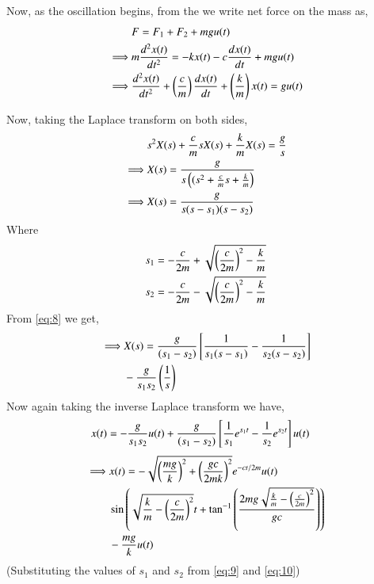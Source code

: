 \documentclass[journal,12pt,twocolumn]{IEEEtran}
\theoremstyle{remark}
\begin{document}
    Now, as the oscillation begins, from the  we write net force on the mass as,
    \begin{align}
        &F=F_{1}+F_{2}+mgu(t) \label{eq:3}\\
        \implies &m\frac{d^2x(t)}{dt^2}=-kx(t)-c\frac{dx(t)}{dt}+mgu(t) \label{eq:4}\\
        \implies &\frac{d^2x(t)}{dt^2}+\brak{\frac{c}{m}}\frac{dx(t)}{dt}+\brak{\frac{k}{m}}x(t)=gu(t) \label{eq:5}
    \end{align}

    Now, taking the Laplace transform on both sides,
    \begin{align}
        &s^2X(s)+\frac{c}{m}sX(s)+\frac{k}{m}X(s)=\frac{g}{s} \label{eq:6}\\
        \implies &X(s)=\frac{g}{s\brak{(s^2+\frac{c}{m}s+\frac{k}{m}}} \label{eq:7}\\
        \implies &X(s)=\frac{g}{s(s-s_1)(s-s_2)} \label{eq:8}
    \end{align}
    Where
    \begin{align}
        &s_1=-\frac{c}{2m}+\sqrt{\brak{\frac{c}{2m}}^2-\frac{k}{m}} \label{eq:9}\\
        &s_2=-\frac{c}{2m}-\sqrt{\brak{\frac{c}{2m}}^2-\frac{k}{m}} \label{eq:10}
    \end{align}
    From \eqref{eq:8} we get,
    \begin{align}
        \begin{split}
            \implies &X(s)=\frac{g}{(s_1-s_2)}\sbrak{\frac{1}{s_1(s-s_1)}-\frac{1}{s_2(s-s_2)}} \\
            &-\frac{g}{s_1s_2}\brak{\frac{1}{s}} \label{eq:11}
        \end{split}
    \end{align}
    Now again taking the inverse Laplace transform we have,
    \begin{align}
        &x(t)=-\frac{g}{s_1s_2}u(t)+\frac{g}{(s_1-s_2)}\sbrak{\frac{1}{s_1}e^{s_1t}-\frac{1}{s_2}e^{s_2t}}u(t)\label{eq:12}
    \end{align}
    \begin{align}
    \begin{split}
    \implies &x(t) = -\sqrt{\brak{\frac{mg}{k}}^2 + \brak{\frac{gc}{2mk}}^2}e^{-ct/2m}u(t) \\
            &\sin{\brak{\sqrt{\frac{k}{m} - \brak{\frac{c}{2m}}^2}t + \tan^{-1}\brak{\frac{2mg\sqrt{\frac{k}{m} - \brak{\frac{c}{2m}}^2}}{gc}}}} \\
            &- \frac{mg}{k}
        u(t) \label{eq:13}
\end{split}
\end{align}
    (Substituting the values of $s_1$ and $s_2$ from \eqref{eq:9} and \eqref{eq:10})
\end{document}
